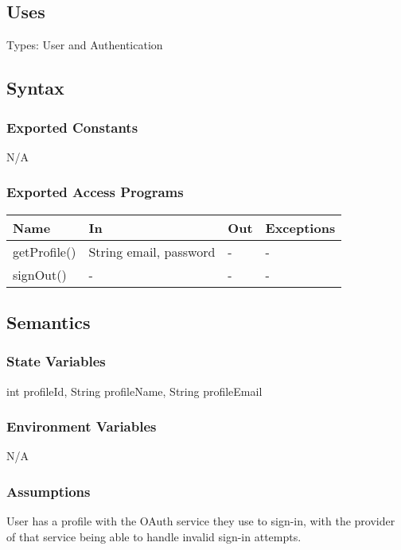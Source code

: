 \documentclass[12pt, titlepage]{article}
\begin{document}
\subsection{Uses}
Types: User and Authentication

\subsection{Syntax}

\subsubsection{Exported Constants}
N/A

\subsubsection{Exported Access Programs}

\begin{center}
\begin{tabular}{p{3cm} p{4cm} p{4cm} p{3cm}}
\hline
\textbf{Name} & \textbf{In} & \textbf{Out} & \textbf{Exceptions} \\
\hline
getProfile() & String email, password & - & - \\
signOut() & - & - & - \\
\hline
\end{tabular}
\end{center}

\subsection{Semantics}

\subsubsection{State Variables}
int profileId, String profileName, String profileEmail

\subsubsection{Environment Variables}
N/A

\subsubsection{Assumptions}
User has a profile with the OAuth service they use to sign-in, with the provider of that service being able to handle invalid sign-in attempts.
\end{document}
